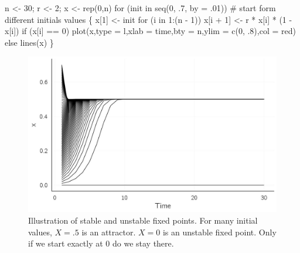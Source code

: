 \documentclass[
  a4paper,
  DIV=11,
  numbers=noendperiod,
  oneside]{scrreprt}
\newenvironment{Shaded}{\begin{snugshade}}{\end{snugshade}}
\newcommand{\AttributeTok}[1]{\textcolor[rgb]{0.40,0.45,0.13}{#1}}
\newcommand{\CommentTok}[1]{\textcolor[rgb]{0.37,0.37,0.37}{#1}}
\newcommand{\ControlFlowTok}[1]{\textcolor[rgb]{0.00,0.23,0.31}{#1}}
\newcommand{\DecValTok}[1]{\textcolor[rgb]{0.68,0.00,0.00}{#1}}
\newcommand{\FunctionTok}[1]{\textcolor[rgb]{0.28,0.35,0.67}{#1}}
\newcommand{\NormalTok}[1]{\textcolor[rgb]{0.00,0.23,0.31}{#1}}
\newcommand{\OtherTok}[1]{\textcolor[rgb]{0.00,0.23,0.31}{#1}}
\newcommand{\SpecialCharTok}[1]{\textcolor[rgb]{0.37,0.37,0.37}{#1}}
\newcommand{\StringTok}[1]{\textcolor[rgb]{0.13,0.47,0.30}{#1}}
\begin{document}
\begin{Shaded}
\begin{Highlighting}[]
\NormalTok{n }\OtherTok{\textless{}{-}} \DecValTok{30}\NormalTok{; r }\OtherTok{\textless{}{-}} \DecValTok{2}\NormalTok{; x }\OtherTok{\textless{}{-}} \FunctionTok{rep}\NormalTok{(}\DecValTok{0}\NormalTok{,n)}
\ControlFlowTok{for}\NormalTok{ (init }\ControlFlowTok{in} \FunctionTok{seq}\NormalTok{(}\DecValTok{0}\NormalTok{, .}\DecValTok{7}\NormalTok{, }\AttributeTok{by =}\NormalTok{ .}\DecValTok{01}\NormalTok{))}
  \CommentTok{\# start form different initials values}
\NormalTok{\{ }
\NormalTok{  x[}\DecValTok{1}\NormalTok{] }\OtherTok{\textless{}{-}}\NormalTok{ init}
  \ControlFlowTok{for}\NormalTok{ (i }\ControlFlowTok{in} \DecValTok{1}\SpecialCharTok{:}\NormalTok{(n }\SpecialCharTok{{-}} \DecValTok{1}\NormalTok{))}
\NormalTok{    x[i }\SpecialCharTok{+} \DecValTok{1}\NormalTok{] }\OtherTok{\textless{}{-}}\NormalTok{ r }\SpecialCharTok{*}\NormalTok{ x[i] }\SpecialCharTok{*}\NormalTok{ (}\DecValTok{1} \SpecialCharTok{{-}}\NormalTok{ x[i])}
  \ControlFlowTok{if}\NormalTok{ (x[i] }\SpecialCharTok{==} \DecValTok{0}\NormalTok{)}
    \FunctionTok{plot}\NormalTok{(x,}\AttributeTok{type =} \StringTok{\textquotesingle{}l\textquotesingle{}}\NormalTok{,}\AttributeTok{xlab =} \StringTok{\textquotesingle{}time\textquotesingle{}}\NormalTok{,}\AttributeTok{bty =} \StringTok{\textquotesingle{}n\textquotesingle{}}\NormalTok{,}\AttributeTok{ylim =} \FunctionTok{c}\NormalTok{(}\DecValTok{0}\NormalTok{, .}\DecValTok{8}\NormalTok{),}\AttributeTok{col =} \StringTok{\textquotesingle{}red\textquotesingle{}}\NormalTok{)}
  \ControlFlowTok{else}
    \FunctionTok{lines}\NormalTok{(x)}
\NormalTok{\}}
\end{Highlighting}
\end{Shaded}

\begin{figure}

{\centering \includegraphics{media/ch2/fig-ch2-img3.jpg}

}

\caption{\label{fig-ch2-img3}Illustration of stable and unstable fixed
points. For many initial values, \(X = .5\) is an attractor. \(X = 0\)
is an unstable fixed point. Only if we start exactly at 0 do we stay
there.}

\end{figure}
\end{document}
